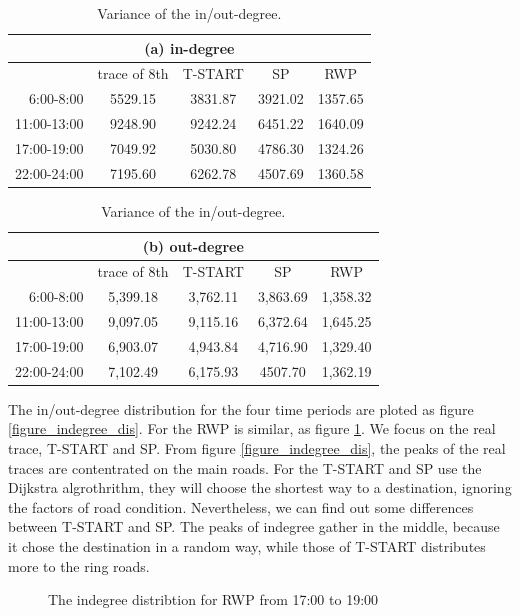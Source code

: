 \begin{table}[!h]
\caption{Variance of the in/out-degree.}\label{table_variance}
\centering
\begin{tabular}{r|c|c|c|c}
\multicolumn{5}{c}{(a) in-degree}\\
\hline
	&trace of 8th	&T-START &SP &RWP\\
\hline
 6:00-8:00	&
5529.15&	3831.87&	3921.02&	1357.65\\ 
 11:00-13:00&
9248.90&	9242.24&	6451.22&	1640.09\\
 17:00-19:00&
7049.92&	5030.80&	4786.30&	1324.26\\
 22:00-24:00&
7195.60&	6262.78&	4507.69&	1360.58\\
\hline
\end{tabular}
\begin{tabular}{r|c|c|c|c}
\hline
\multicolumn{5}{c}{(b) out-degree}\\
\hline
	&trace of 8th	&T-START &SP &RWP\\
\hline
 6:00-8:00	&
5,399.18&3,762.11&3,863.69&1,358.32\\
 11:00-13:00&
9,097.05&9,115.16&6,372.64&1,645.25\\
 17:00-19:00&
6,903.07&4,943.84&4,716.90&1,329.40\\
 22:00-24:00&
7,102.49&6,175.93&4507.70&1,362.19\\
\hline
\end{tabular}
\end{table}
The in/out-degree distribution for the four time periods are ploted as figure \ref{figure_indegree_dis}.
For the RWP is similar, as figure \ref{figure_indegree_rwp}. We focus on the real trace, T-START and SP.  
From figure \ref{figure_indegree_dis}, the peaks of the real traces are contentrated on the main roads. For the T-START and SP use the Dijkstra algrothrithm, they will choose the shortest way to a destination, ignoring the factors of road condition. Nevertheless, we can find out some differences between T-START and SP. The peaks of indegree gather in the middle, because it chose the destination in a random way, while those of T-START distributes more to the ring roads.
\begin{figure}[!h]
\centering
\epsfysize=1.5in 
\caption{The indegree distribtion for RWP from 17:00 to 19:00}\label{figure_indegree_rwp}
\end{figure}
